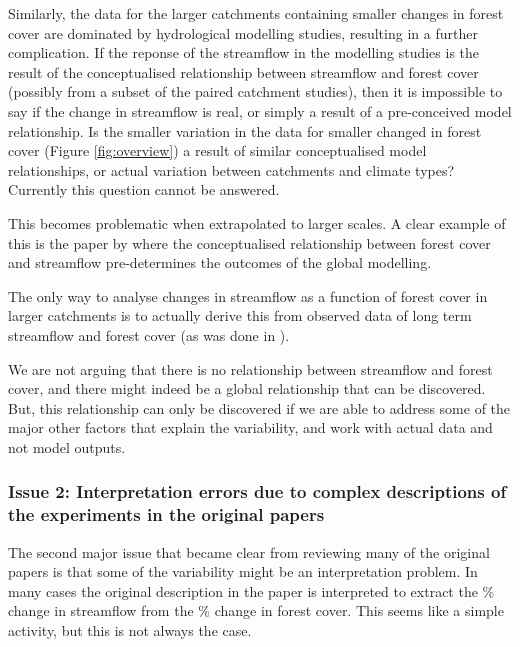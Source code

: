 \documentclass[]{elsarticle} %
\begin{document}
Similarly, the data for the larger catchments containing smaller changes in forest cover are dominated by hydrological modelling studies, resulting in a further complication. If the reponse of the streamflow in the modelling studies is the result of the conceptualised relationship between streamflow and forest cover (possibly from a subset of the paired catchment studies), then it is impossible to say if the change in streamflow is real, or simply a result of a pre-conceived model relationship. Is the smaller variation in the data for smaller changed in forest cover (Figure \ref{fig:overview}) a result of similar conceptualised model relationships, or actual variation between catchments and climate types? Currently this question cannot be answered.

This becomes problematic when extrapolated to larger scales. A clear example of this is the paper by \citet{hoekvandijke2022} where the conceptualised relationship between forest cover and streamflow pre-determines the outcomes of the global modelling.

The only way to analyse changes in streamflow as a function of forest cover in larger catchments is to actually derive this from observed data of long term streamflow and forest cover (as was done in \citet{levy2018}).

We are not arguing that there is no relationship between streamflow and forest cover, and there might indeed be a global relationship that can be discovered. But, this relationship can only be discovered if we are able to address some of the major other factors that explain the variability, and work with actual data and not model outputs.

\hypertarget{issue-2-interpretation-errors-due-to-complex-descriptions-of-the-experiments-in-the-original-papers}{%
\subsubsection{Issue 2: Interpretation errors due to complex descriptions of the experiments in the original papers}\label{issue-2-interpretation-errors-due-to-complex-descriptions-of-the-experiments-in-the-original-papers}}

The second major issue that became clear from reviewing many of the original papers is that some of the variability might be an interpretation problem. In many cases the original description in the paper is interpreted to extract the \% change in streamflow from the \% change in forest cover. This seems like a simple activity, but this is not always the case.
\end{document}
